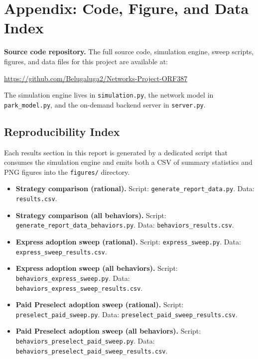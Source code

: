 \documentclass[11pt]{article}
\begin{document}
\section{Appendix: Code, Figure, and Data Index}

\textbf{Source code repository.} The full source code, simulation engine, sweep scripts, figures, and data files for this project are available at:
\begin{center}
\url{https://github.com/Belugaluga2/Networks-Project-ORF387}
\end{center}

\noindent The simulation engine lives in \texttt{simulation.py}, the network model in \texttt{park\_model.py}, and the on-demand backend server in \texttt{server.py}.

\subsection*{Reproducibility Index}

Each results section in this report is generated by a dedicated script that consumes the simulation engine and emits both a CSV of summary statistics and PNG figures into the \texttt{figures/} directory.

\begin{itemize}[leftmargin=*, itemsep=4pt]
    \item \textbf{Strategy comparison (rational).}
        Script: \texttt{generate\_report\_data.py}.
        Data: \texttt{results.csv}.
    \item \textbf{Strategy comparison (all behaviors).}
        Script: \texttt{generate\_report\_data\_behaviors.py}.
        Data: \texttt{behaviors\_results.csv}.
    \item \textbf{Express adoption sweep (rational).}
        Script: \texttt{express\_sweep.py}.
        Data: \texttt{express\_sweep\_results.csv}.
    \item \textbf{Express adoption sweep (all behaviors).}
        Script: \texttt{behaviors\_express\_sweep.py}.
        Data: \texttt{behaviors\_express\_sweep\_results.csv}.
    \item \textbf{Paid Preselect adoption sweep (rational).}
        Script: \texttt{preselect\_paid\_sweep.py}.
        Data: \texttt{preselect\_paid\_sweep\_results.csv}.
    \item \textbf{Paid Preselect adoption sweep (all behaviors).}
        Script: \texttt{behaviors\_preselect\_paid\_sweep.py}.
        Data: \texttt{behaviors\_preselect\_paid\_sweep\_results.csv}.
\end{itemize}
\end{document}
